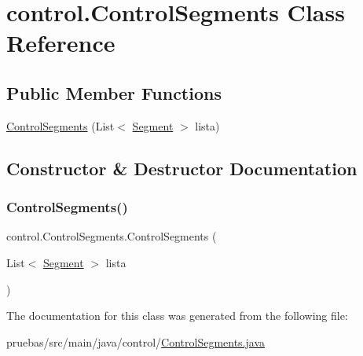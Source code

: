\hypertarget{classcontrol_1_1_control_segments}{}\section{control.\+Control\+Segments Class Reference}
\label{classcontrol_1_1_control_segments}
\subsection*{Public Member Functions}
\begin{DoxyCompactItemize}
\item 
\mbox{\hyperlink{classcontrol_1_1_control_segments_a6ff0d2b5dfb42fb1fa6d5e855b250412}{Control\+Segments}} (List$<$ \mbox{\hyperlink{classclases_1_1_segment}{Segment}} $>$ lista)
\end{DoxyCompactItemize}


\subsection{Constructor \& Destructor Documentation}
\mbox{\label{classcontrol_1_1_control_segments_a6ff0d2b5dfb42fb1fa6d5e855b250412}} 
\subsubsection{\texorpdfstring{Control\+Segments()}{ControlSegments()}}
{\footnotesize\ttfamily control.\+Control\+Segments.\+Control\+Segments (\begin{DoxyParamCaption}\item[{List$<$ \mbox{\hyperlink{classclases_1_1_segment}{Segment}} $>$}]{lista }\end{DoxyParamCaption})}



The documentation for this class was generated from the following file\+:\begin{DoxyCompactItemize}
\item 
pruebas/src/main/java/control/\mbox{\hyperlink{_control_segments_8java}{Control\+Segments.\+java}}\end{DoxyCompactItemize}
